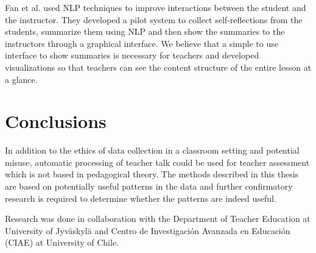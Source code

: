 \documentclass[utf8,english]{gradu3}
\begin{document}
Fan et al. \parencite*{fanCourseMIRROREnhancingLarge2015} used NLP techniques to improve interactions between the student and the instructor. They developed a pilot system to collect self-reflections from the students, summarize them using NLP and then show the summaries to the instructors through a graphical interface. We believe that a simple to use interface to show summaries is necessary for teachers and developed visualizations so that teachers can see the content structure of the entire lesson at a glance.



\chapter{Conclusions}




In addition to the ethics of data collection in a classroom setting and potential misuse, automatic processing of teacher talk could be used for teacher assessment which is not based in pedagogical theory. The methods described in this thesis are based on potentially useful patterns in the data and further confirmatory research is required to determine whether the patterns are indeed useful.


Research was done in collaboration with the Department of Teacher Education at University of Jyväskylä and Centro de Investigación Avanzada en Educación (CIAE) at University of Chile.
 
\printbibliography
\end{document}
